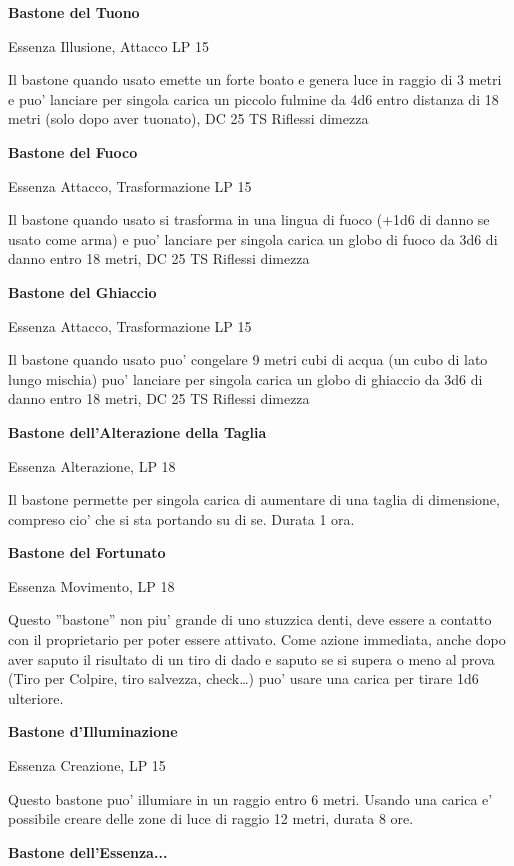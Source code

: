 \documentclass[a4paper,11pt,twoside,openany]{book}
\begin{document}
{\textbf{Bastone del Tuono}

Essenza Illusione, Attacco LP 15

Il bastone quando usato emette un forte boato e genera luce in raggio di 3 metri e puo' lanciare per singola carica un piccolo fulmine da 4d6 entro distanza di 18 metri (solo dopo aver tuonato), DC 25 TS Riflessi dimezza

\textbf{Bastone del Fuoco}

Essenza Attacco, Trasformazione LP 15

Il bastone quando usato si trasforma in una lingua di fuoco (+1d6 di danno se usato come arma) e puo' lanciare per singola carica un globo di fuoco da 3d6 di danno entro 18 metri, DC 25 TS Riflessi dimezza

\textbf{Bastone del Ghiaccio}

Essenza Attacco, Trasformazione LP 15

Il bastone quando usato puo' congelare 9 metri cubi di acqua (un cubo di lato lungo mischia) puo' lanciare per singola carica un globo di ghiaccio da 3d6 di danno entro 18 metri, DC 25 TS Riflessi dimezza 

\textbf{Bastone dell'Alterazione della Taglia}

Essenza Alterazione, LP 18

Il bastone permette per singola carica di aumentare di una taglia di dimensione, compreso cio' che si sta portando su di se. Durata 1 ora.

\textbf{Bastone del Fortunato}

Essenza Movimento, LP 18

Questo ''bastone'' non piu' grande di uno stuzzica denti, deve essere a contatto con il proprietario per poter essere attivato. Come azione immediata, anche dopo aver saputo il risultato di un tiro di dado e saputo se si supera o meno al prova (Tiro per Colpire, tiro salvezza, check\ldots ) puo' usare una carica per tirare 1d6 ulteriore.

\textbf{Bastone d'Illuminazione}

Essenza Creazione, LP 15

Questo bastone puo' illumiare in un raggio entro 6 metri. Usando una carica e' possibile creare delle zone di luce di raggio 12 metri, durata 8 ore.

\textbf{Bastone dell'Essenza...}

}
\end{document}
